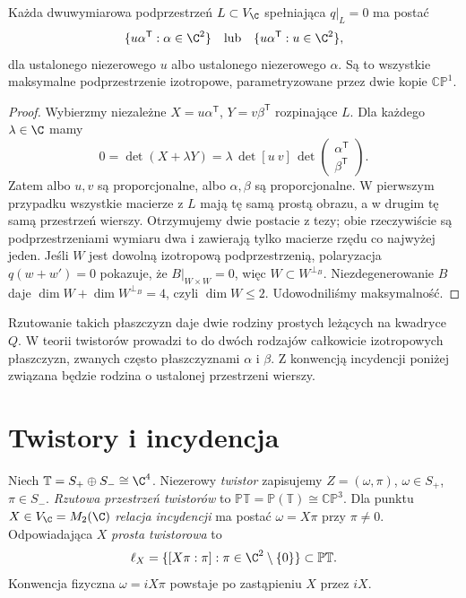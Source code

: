 \begin{twierdzenie}
\label{thm:lin32-rodziny}
Każda dwuwymiarowa podprzestrzeń $L\subset V_{\C}$
spełniająca $q|_L=0$ ma postać
\[
 \{u\alpha^{\mathsf T}:\alpha\in\C^2\}
 \quad\text{lub}\quad
 \{u\alpha^{\mathsf T}:u\in\C^2\},
\]
dla ustalonego niezerowego $u$ albo ustalonego
niezerowego $\alpha$. Są to wszystkie maksymalne
podprzestrzenie izotropowe, parametryzowane
przez dwie kopie $\mathbb{CP}^1$.
\end{twierdzenie}
\begin{proof}
Wybierzmy niezależne
$X=u\alpha^{\mathsf T}$, $Y=v\beta^{\mathsf T}$
rozpinające $L$. Dla każdego $\lambda\in\C$
mamy
\[
 0=\det(X+\lambda Y)
 =\lambda\,\det[u\ v]\,
 \det\begin{pmatrix}\alpha^{\mathsf T}\\
                     \beta^{\mathsf T}\end{pmatrix}.
\]
Zatem albo $u,v$ są proporcjonalne, albo
$\alpha,\beta$ są proporcjonalne.
W pierwszym przypadku wszystkie macierze z $L$
mają tę samą prostą obrazu, a w drugim
tę samą przestrzeń wierszy. Otrzymujemy dwie postacie
z tezy; obie rzeczywiście są podprzestrzeniami
wymiaru dwa i zawierają tylko macierze rzędu
co najwyżej jeden. Jeśli $W$ jest dowolną
izotropową podprzestrzenią, polaryzacja
$q(w+w')=0$ pokazuje, że $B|_{W\times W}=0$,
więc $W\subset W^{\perp_B}$.
Niezdegenerowanie $B$ daje
$\dim W+\dim W^{\perp_B}=4$,
czyli $\dim W\le2$. Udowodniliśmy maksymalność.
\end{proof}

Rzutowanie takich płaszczyzn daje dwie rodziny
prostych leżących na kwadryce $Q$.
W teorii twistorów prowadzi to do dwóch rodzajów
całkowicie izotropowych płaszczyzn, zwanych
często płaszczyznami $\alpha$ i $\beta$.
Z konwencją incydencji poniżej związana będzie
rodzina o ustalonej przestrzeni wierszy.

\section{Twistory i incydencja}
\label{sec:lin32-incydencja}
\begin{definicja}
\label{def:lin32-twistor}
Niech $\mathbb T=S_+\oplus S_-\cong\C^4$.
Niezerowy \emph{twistor} zapisujemy
$Z=(\omega,\pi)$, $\omega\in S_+$, $\pi\in S_-$.
\emph{Rzutowa przestrzeń twistorów} to
$\mathbb{PT}=\mathbb P(\mathbb T)\cong\mathbb{CP}^3$.
Dla punktu $X\in V_{\C}=M_2(\C)$
\emph{relacja incydencji} ma postać
$\omega=X\pi$ przy $\pi\ne0$.
Odpowiadająca $X$ \emph{prosta twistorowa} to
\[
 \ell_X=\{[X\pi:\pi]:\pi\in\C^2\setminus\{0\}\}
                   \subset\mathbb{PT}.
\]
Konwencja fizyczna $\omega=iX\pi$ powstaje
po zastąpieniu $X$ przez $iX$.
\end{definicja}

